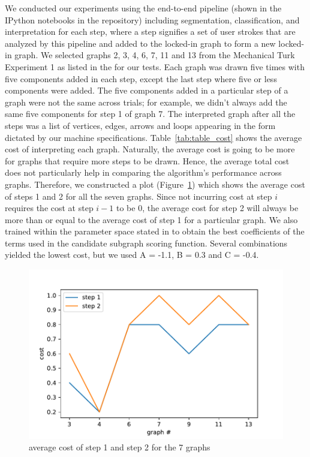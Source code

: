 We conducted our experiments using the end-to-end pipeline (shown in the IPython notebooks in the repository) including segmentation, classification, and interpretation for each step, where a step signifies a set of user strokes that are analyzed by this pipeline and added to the locked-in graph to form a new locked-in graph. We selected graphs 2, 3, 4, 6, 7, 11 and 13 from the Mechanical Turk Experiment 1 as listed in the \cite{daly2015hand} for our tests. Each graph was drawn five times with five components added in each step, except the last step where five or less components were added. The five components added in a particular step of a graph were not the same across trials; for example, we didn't always add the same five components for step 1 of graph 7. The interpreted graph after all the steps was a list of vertices, edges, arrows and loops appearing in the form dictated by our machine specifications. Table~\ref{tab:table_cost} shows the average cost of interpreting each graph. Naturally, the average cost is going to be more for graphs that require more steps to be drawn. Hence, the average total cost does not particularly help in comparing the algorithm's performance across graphs. Therefore, we constructed a plot (Figure~\ref{fig:cost_plot}) which shows the average cost of steps 1 and 2 for all the seven graphs. Since not incurring cost at step $i$ requires the cost at step $i-1$ to be 0, the average cost for step 2 will always be more than or equal to the average cost of step 1 for a particular graph. We also trained within the parameter space stated in \cite{daly2015hand} to obtain the best coefficients of the terms used in the candidate subgraph scoring function. Several combinations yielded the lowest cost, but we used A = -1.1, B = 0.3 and C = -0.4.

\begin{figure}[!htb]
    \centering
    \includegraphics[scale=0.55]{./img/cost_plot.pdf}
    \caption{average cost of step 1 and step 2 for the 7 graphs}
    \label{fig:cost_plot}
\end{figure}

